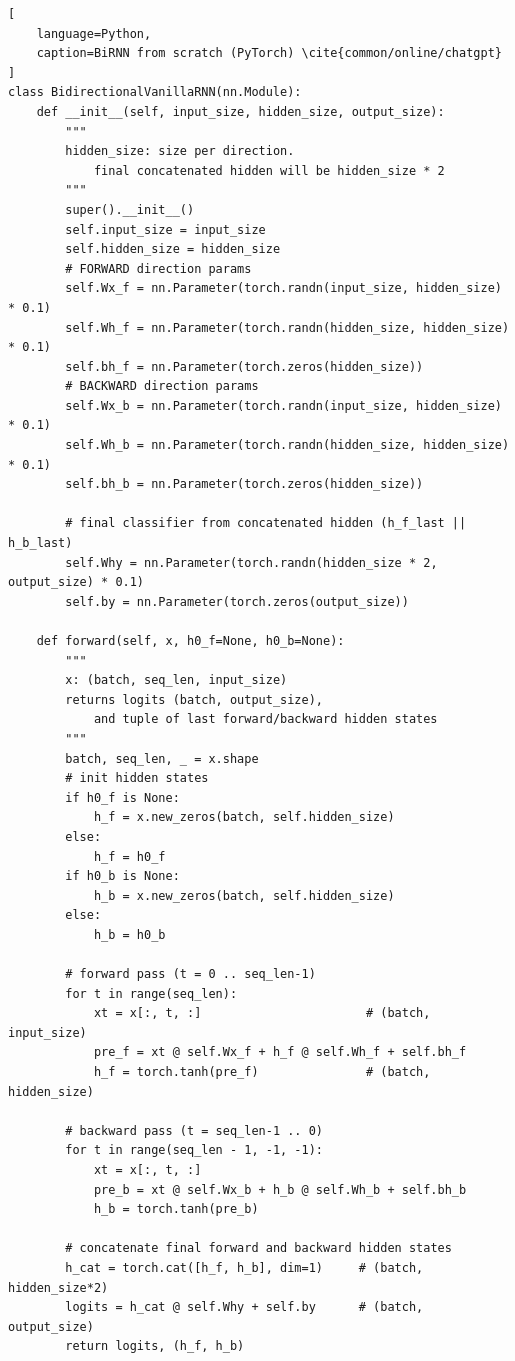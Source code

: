 \begin{lstlisting}[
    language=Python,
    caption=BiRNN from scratch (PyTorch) \cite{common/online/chatgpt}
]
class BidirectionalVanillaRNN(nn.Module):
    def __init__(self, input_size, hidden_size, output_size):
        """
        hidden_size: size per direction. 
            final concatenated hidden will be hidden_size * 2
        """
        super().__init__()
        self.input_size = input_size
        self.hidden_size = hidden_size
        # FORWARD direction params
        self.Wx_f = nn.Parameter(torch.randn(input_size, hidden_size) * 0.1)
        self.Wh_f = nn.Parameter(torch.randn(hidden_size, hidden_size) * 0.1)
        self.bh_f = nn.Parameter(torch.zeros(hidden_size))
        # BACKWARD direction params
        self.Wx_b = nn.Parameter(torch.randn(input_size, hidden_size) * 0.1)
        self.Wh_b = nn.Parameter(torch.randn(hidden_size, hidden_size) * 0.1)
        self.bh_b = nn.Parameter(torch.zeros(hidden_size))

        # final classifier from concatenated hidden (h_f_last || h_b_last)
        self.Why = nn.Parameter(torch.randn(hidden_size * 2, output_size) * 0.1)
        self.by = nn.Parameter(torch.zeros(output_size))

    def forward(self, x, h0_f=None, h0_b=None):
        """
        x: (batch, seq_len, input_size)
        returns logits (batch, output_size), 
            and tuple of last forward/backward hidden states
        """
        batch, seq_len, _ = x.shape
        # init hidden states
        if h0_f is None:
            h_f = x.new_zeros(batch, self.hidden_size)
        else:
            h_f = h0_f
        if h0_b is None:
            h_b = x.new_zeros(batch, self.hidden_size)
        else:
            h_b = h0_b

        # forward pass (t = 0 .. seq_len-1)
        for t in range(seq_len):
            xt = x[:, t, :]                       # (batch, input_size)
            pre_f = xt @ self.Wx_f + h_f @ self.Wh_f + self.bh_f
            h_f = torch.tanh(pre_f)               # (batch, hidden_size)

        # backward pass (t = seq_len-1 .. 0)
        for t in range(seq_len - 1, -1, -1):
            xt = x[:, t, :]
            pre_b = xt @ self.Wx_b + h_b @ self.Wh_b + self.bh_b
            h_b = torch.tanh(pre_b)

        # concatenate final forward and backward hidden states
        h_cat = torch.cat([h_f, h_b], dim=1)     # (batch, hidden_size*2)
        logits = h_cat @ self.Why + self.by      # (batch, output_size)
        return logits, (h_f, h_b)
\end{lstlisting}




